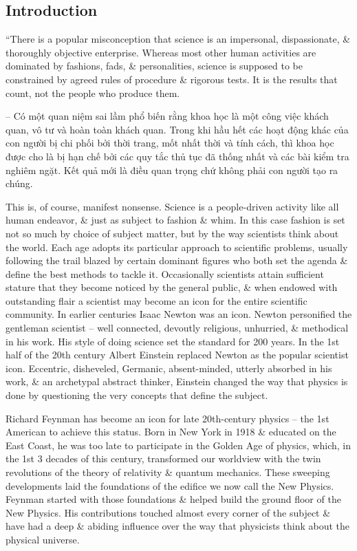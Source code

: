 \documentclass{article}
\begin{document}
\subsection*{Introduction}
``There is a popular misconception that science is an impersonal, dispassionate, \& thoroughly objective enterprise. Whereas most other human activities are dominated by fashions, fads, \& personalities, science is supposed to be constrained by agreed rules of procedure \& rigorous tests. It is the results that count, not the people who produce them.

-- Có một quan niệm sai lầm phổ biến rằng khoa học là một công việc khách quan, vô tư và hoàn toàn khách quan. Trong khi hầu hết các hoạt động khác của con người bị chi phối bởi thời trang, mốt nhất thời và tính cách, thì khoa học được cho là bị hạn chế bởi các quy tắc thủ tục đã thống nhất và các bài kiểm tra nghiêm ngặt. Kết quả mới là điều quan trọng chứ không phải con người tạo ra chúng.

This is, of course, manifest nonsense. Science is a people-driven activity like all human endeavor, \& just as subject to fashion \& whim. In this case fashion is set not so much by choice of subject matter, but by the way scientists think about the world. Each age adopts its particular approach to scientific problems, usually following the trail blazed by certain dominant figures who both set the agenda \& define the best methods to tackle it. Occasionally scientists attain sufficient stature that they become noticed by the general public, \& when endowed with outstanding flair a scientist may become an icon for the entire scientific community. In earlier centuries {\sc Isaac Newton} was an icon. {\sc Newton} personified the gentleman scientist -- well connected, devoutly religious, unhurried, \& methodical in his work. His style of doing science set the standard for 200 years. In the 1st half of the 20th century {\sc Albert Einstein} replaced {\sc Newton} as the popular scientist icon. Eccentric, disheveled, Germanic, absent-minded, utterly absorbed in his work, \& an archetypal abstract thinker, {\sc Einstein} changed the way that physics is done by questioning the very concepts that define the subject.

{\sc Richard Feynman} has become an icon for late 20th-century physics -- the 1st American to achieve this status. Born in New York in 1918 \& educated on the East Coast, he was too late to participate in the Golden Age of physics, which, in the 1st 3 decades of this century, transformed our worldview with the twin revolutions of the theory of relativity \& quantum mechanics. These sweeping developments laid the foundations of the edifice we now call the New Physics. {\sc Feynman} started with those foundations \& helped build the ground floor of the New Physics. His contributions touched almost every corner of the subject \& have had a deep \& abiding influence over the way that physicists think about the physical universe.
\end{document}
